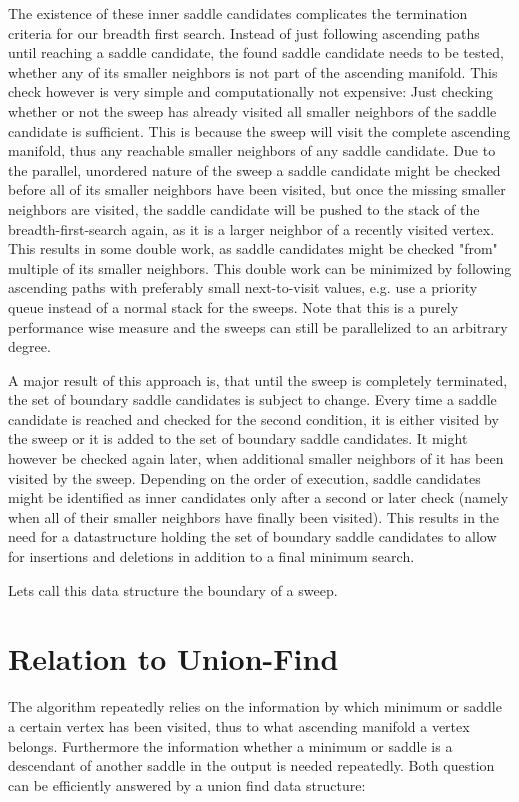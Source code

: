 \documentclass[%
	paper=A4,					%
	twoside=true,				%
	openright,					%
	parskip=full,				%
	chapterprefix=true,			%
	11pt,						%
	headings=normal,			%
	bibliography=totoc,			%
	listof=totoc,				%
	titlepage=on,				%
	captions=tableabove,		%
	draft=false,				%
]{scrreprt}%
\begin{document}
The existence of these inner saddle candidates complicates the termination criteria for our breadth first search. Instead of just following ascending paths until reaching a saddle candidate, the found saddle candidate needs to be tested, whether any of its smaller neighbors is not part of the ascending manifold. This check however is very simple and computationally not expensive: Just checking whether or not the sweep has already visited all smaller neighbors of the saddle candidate is sufficient. This is because the sweep will visit the complete ascending manifold, thus any reachable smaller neighbors of any saddle candidate. Due to the parallel, unordered nature of the sweep a saddle candidate might be checked before all of its smaller neighbors have been visited, but once the missing smaller neighbors are visited, the saddle candidate will be pushed to the stack of the breadth-first-search again, as it is a larger neighbor of a recently visited vertex. This results in some double work, as saddle candidates might be checked "from" multiple of its smaller neighbors. This double work can be minimized by following ascending paths with preferably small next-to-visit values, e.g. use a priority queue instead of a normal stack for the sweeps. Note that this is a purely performance wise measure and the sweeps can still be parallelized to an arbitrary degree.

A major result of this approach is, that until the sweep is completely terminated, the set of boundary saddle candidates is subject to change. Every time a saddle candidate is reached and checked for the second condition, it is either visited by the sweep or it is added to the set of boundary saddle candidates. It might however be checked again later, when additional smaller neighbors of it has been visited by the sweep. Depending on the order of execution, saddle candidates might be identified as inner candidates only after a second or later check (namely when all of their smaller neighbors have finally been visited). This results in the need for a datastructure holding the set of boundary saddle candidates to allow for insertions and deletions in addition to a final minimum search. 

Lets call this data structure the boundary of a sweep.

\section{Relation to Union-Find}
The algorithm repeatedly relies on the information by which minimum or saddle a certain vertex has been visited, thus to what ascending manifold a vertex belongs. Furthermore the information whether a minimum or saddle is a descendant of another saddle in the output is needed repeatedly. Both question can be efficiently answered by a union find data structure:
\end{document}
